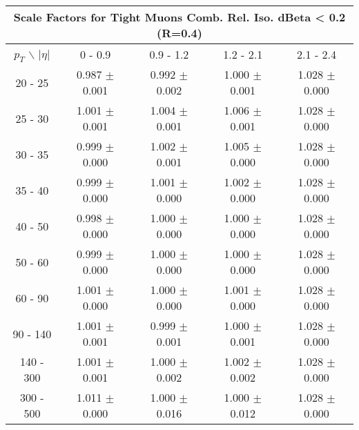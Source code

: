 \begin{tabular}{ccccc}
\multicolumn{5}{c}{Scale Factors for Tight Muons Comb. Rel. Iso. dBeta < 0.2 (R=0.4)} \\ \hline
$p_T$  $\backslash$ $|\eta|$ & 0 - 0.9 & 0.9 - 1.2 & 1.2 - 2.1 & 2.1 - 2.4 \\ \hline
20 - 25  &  0.987 $\pm$ 0.001  &  0.992 $\pm$ 0.002  &  1.000 $\pm$ 0.001  &  1.028 $\pm$ 0.000\\ 
25 - 30  &  1.001 $\pm$ 0.001  &  1.004 $\pm$ 0.001  &  1.006 $\pm$ 0.001  &  1.028 $\pm$ 0.000\\ 
30 - 35  &  0.999 $\pm$ 0.000  &  1.002 $\pm$ 0.001  &  1.005 $\pm$ 0.000  &  1.028 $\pm$ 0.000\\ 
35 - 40  &  0.999 $\pm$ 0.000  &  1.001 $\pm$ 0.000  &  1.002 $\pm$ 0.000  &  1.028 $\pm$ 0.000\\ 
40 - 50  &  0.998 $\pm$ 0.000  &  1.000 $\pm$ 0.000  &  1.000 $\pm$ 0.000  &  1.028 $\pm$ 0.000\\ 
50 - 60  &  0.999 $\pm$ 0.000  &  1.000 $\pm$ 0.000  &  1.000 $\pm$ 0.000  &  1.028 $\pm$ 0.000\\ 
60 - 90  &  1.001 $\pm$ 0.000  &  1.000 $\pm$ 0.000  &  1.001 $\pm$ 0.000  &  1.028 $\pm$ 0.000\\ 
90 - 140  &  1.001 $\pm$ 0.001  &  0.999 $\pm$ 0.001  &  1.000 $\pm$ 0.001  &  1.028 $\pm$ 0.000\\ 
140 - 300  &  1.001 $\pm$ 0.001  &  1.000 $\pm$ 0.002  &  1.002 $\pm$ 0.002  &  1.028 $\pm$ 0.000\\ 
300 - 500  &  1.011 $\pm$ 0.000  &  1.000 $\pm$ 0.016  &  1.000 $\pm$ 0.012  &  1.028 $\pm$ 0.000\\ 
\hline \end{tabular}
